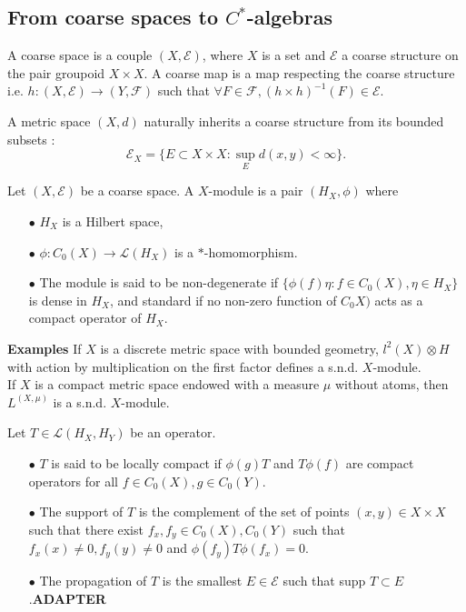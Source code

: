 \subsection{From coarse spaces to $C^*$-algebras}

\begin{definition}
A coarse space is a couple $(X,\mathcal E)$, where $X$ is a set and $\mathcal E$ a coarse structure on the pair groupoid $X\times X$. A coarse map is a map respecting the coarse structure i.e. $h : (X,\mathcal E)\rightarrow (Y,\mathcal F)$ such that $\forall F\in\mathcal F,(h\times h)^{-1}(F)\in \mathcal E$.
\end{definition}

A metric space $(X,d)$ naturally inherits a coarse structure from its bounded subsets :
\[\mathcal E_X = \{E\subset X\times X : \sup_{E} d(x,y)<\infty\}.\]

\begin{definition}
Let $(X,\mathcal E)$ be a coarse space. A $X$-module is a pair $(H_X,\phi )$ where 
\begin{itemize}
\item[$\bullet$] $H_X$ is a Hilbert space, 
\item[$\bullet$] $\phi : C_0(X)\rightarrow \mathcal L(H_X)$ is a $*$-homomorphism.
\item[$\bullet$] The module is said to be non-degenerate if $\{\phi(f)\eta : f\in C_0(X),\eta\in H_X\}$ is dense in $H_X$, and standard if no non-zero function of $C_0X)$ acts as a compact operator of $H_X$.
\end{itemize}
\end{definition}

\textbf{Examples} If $X$ is a discrete metric space with bounded geometry, $l^2(X)\otimes H$ with action by multiplication on the first factor defines a s.n.d. $X$-module.\\
If $X$ is a compact metric space endowed with a measure $\mu$ without atoms, then $L^(X,\mu)$ is a s.n.d. $X$-module.\\

\begin{definition}
Let $T\in \mathcal L(H_X, H_Y)$ be an operator.
\begin{itemize}
\item[$\bullet$] $T$ is said to be locally compact if $\phi(g)T$ and $T\phi(f)$ are compact operators for all $f\in C_0(X),g\in C_0(Y)$.
\item[$\bullet$] The support of $T$ is the complement of the set of points $(x,y)\in X\times X$ such that there exist $f_x,f_y\in C_0(X),C_0(Y)$ such that $f_x(x)\neq 0,f_{y}(y)\neq 0$ and $\phi(f_{y}) T \phi(f_x)=0$.
\item[$\bullet$] The propagation of $T$ is the smallest $E\in \mathcal E$ such that supp $T \subset E$.\textbf{ADAPTER}
\end{itemize}
\end{definition}


